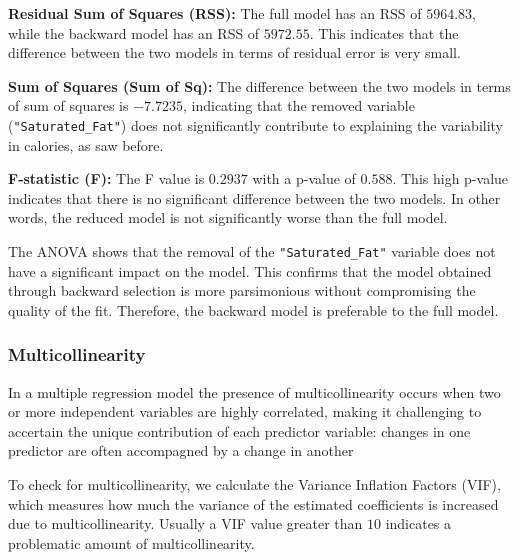 \documentclass[
]{article}
\begin{document}
\textbf{Residual Sum of Squares (RSS):} The full model has an RSS of
\(5964.83\), while the backward model has an RSS of \(5972.55\). This
indicates that the difference between the two models in terms of
residual error is very small.

\textbf{Sum of Squares (Sum of Sq):} The difference between the two
models in terms of sum of squares is \(-7.7235\), indicating that the
removed variable (\texttt{"Saturated\_Fat"}) does not significantly
contribute to explaining the variability in calories, as saw before.

\textbf{F-statistic (F):} The F value is \(0.2937\) with a p-value of
\(0.588\). This high p-value indicates that there is no significant
difference between the two models. In other words, the reduced model is
not significantly worse than the full model.

The ANOVA shows that the removal of the \texttt{"Saturated\_Fat"}
variable does not have a significant impact on the model. This confirms
that the model obtained through backward selection is more parsimonious
without compromising the quality of the fit. Therefore, the backward
model is preferable to the full model.

\subsubsection{Multicollinearity}\label{multicollinearity}

In a multiple regression model the presence of multicollinearity occurs
when two or more independent variables are highly correlated, making it
challenging to accertain the unique contribution of each predictor
variable: changes in one predictor are often accompagned by a change in
another

To check for multicollinearity, we calculate the Variance Inflation
Factors (VIF), which measures how much the variance of the estimated
coefficients is increased due to multicollinearity. Usually a VIF value
greater than \(10\) indicates a problematic amount of multicollinearity.
\end{document}
